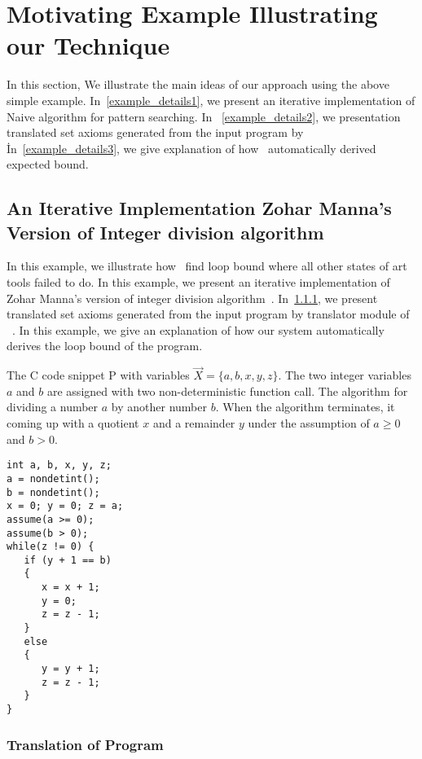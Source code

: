 \section{Motivating Example Illustrating our Technique}
\label{sec:overview}
In this section, We illustrate the main ideas of our approach using the above simple example. In~\ref{example_details1},
we present an iterative implementation of Naive algorithm for pattern searching. In ~\ref{example_details2}, we presentation translated set axioms generated from the input program by \SystemName\. In~\ref{example_details3}, we give explanation of how \SystemName\ automatically derived expected bound. 










\subsection{An Iterative Implementation Zohar Manna's Version of Integer division algorithm}\label{example1_1}

In this example, we illustrate how \SystemName\ find loop bound where all other states of art tools failed to do. In this example, we present an iterative implementation of Zohar Manna's version of integer division algorithm~\cite{Manna:1974:IMT:542899}.
In~\ref{example1_2}, we present translated set axioms generated from
the input program by translator module of \SystemName\ . In this example, we give an explanation of how our system automatically derives the loop bound of the program.


The C code snippet P with variables $\vec{X}=\{a,b,x,y,z\}$. The two integer variables $a$ and $b$ are assigned with two non-deterministic function call. The algorithm for dividing a number $a$ by another number $b$. When the algorithm terminates, it coming up with a quotient $x$ and a remainder $y$ under the assumption of $a\geq 0$ and $b>0$.


\begin{verbatim}
int a, b, x, y, z;
a = nondetint(); 
b = nondetint();
x = 0; y = 0; z = a;
assume(a >= 0);  
assume(b > 0);
while(z != 0) {
   if (y + 1 == b)  
   { 
      x = x + 1;  
      y = 0;  
      z = z - 1; 
   }
   else 
   { 
      y = y + 1; 
      z = z - 1; 
   }
}
\end{verbatim}

\subsubsection{Translation of Program}\label{example1_2}


